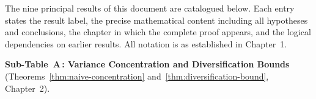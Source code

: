 \documentclass[12pt,openany]{book}
\numberwithin{equation}{chapter}
\theoremstyle{plain}
\theoremstyle{definition}
\theoremstyle{remark}
\begin{document}

\noindent
The nine principal results of this document are catalogued below.
Each entry states the result label, the precise mathematical content
including all hypotheses and conclusions, the chapter in which the
complete proof appears, and the logical dependencies on earlier
results.  All notation is as established in Chapter~1.

\medskip
\noindent\textbf{Sub-Table~A\,: Variance Concentration and
Diversification Bounds} (Theorems~\ref{thm:naive-concentration}
and~\ref{thm:diversification-bound}, Chapter~2).
\end{document}
